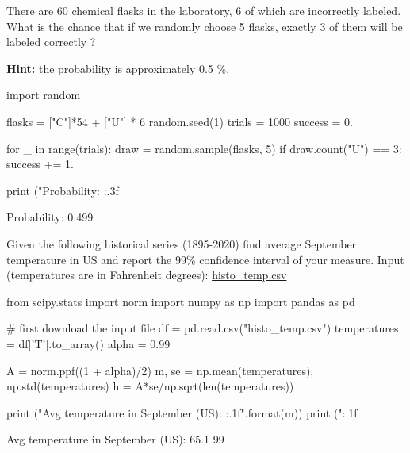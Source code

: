 \begin{question}
There are 60 chemical flasks in the laboratory, 6 of which are incorrectly labeled. What is the chance that if we randomly choose 5 flasks, exactly 3 of them will be labeled correctly ?

\noindent\textbf{Hint:} the probability is approximately 0.5 \%.
\end{question}

\cprotEnv\begin{solution}
\begin{ipython}
import random

flasks = ["C"]*54 + ["U"] * 6
random.seed(1)
trials = 1000
success = 0.

for _ in range(trials):
    draw = random.sample(flasks, 5)
    if draw.count("U") == 3:
        success += 1.

print ("Probability: {:.3f}%
\end{ipython}
\begin{ioutput}
Probability: 0.499%
\end{ioutput}
\end{solution}

\begin{question}
Given the following historical series (1895-2020) find average September temperature in US and report the 99\% confidence interval of your measure.
\noindent
Input (temperatures are in Fahrenheit degrees): \href{https://raw.githubusercontent.com/matteosan1/finance_course/develop/libro/input_files/histo_temp.csv}{histo\_temp.csv}
\end{question}

\cprotEnv\begin{solution}
\begin{ipython}
from scipy.stats import norm
import numpy as np
import pandas as pd

# first download the input file
df = pd.read.csv("histo_temp.csv")
temperatures = df['T'].to_array()
alpha = 0.99

A = norm.ppf((1 + alpha)/2)
m, se = np.mean(temperatures), np.std(temperatures)
h = A*se/np.sqrt(len(temperatures))

print ("Avg temperature in September (US): {:.1f}".format(m))
print ("{:.1f}%
\end{ipython}
\begin{ioutput}
Avg temperature in September (US): 65.1
99%
\end{ioutput}
\end{solution}

